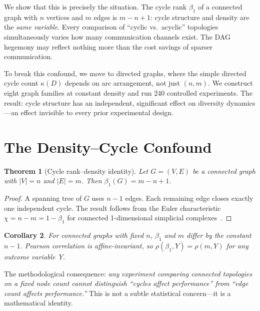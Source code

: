 \documentclass[10pt,twocolumn]{article}
\newtheorem{theorem}{Theorem}
\newtheorem{corollary}[theorem]{Corollary}
\begin{document}
We show that this is precisely the situation. The cycle rank $\beta_1$ of a
connected graph with $n$ vertices and $m$ edges is $m - n + 1$: cycle
structure and density are the \emph{same variable}. Every comparison of
``cyclic vs.\ acyclic'' topologies simultaneously varies how many
communication channels exist. The DAG hegemony may reflect nothing more than
the cost savings of sparser communication.

To break this confound, we move to directed graphs, where the simple
directed cycle count $\kappa(D)$ depends on arc arrangement, not just
$(n, m)$. We construct eight graph families at constant density and run
240 controlled experiments. The result: cycle structure has an independent,
significant effect on diversity dynamics---an effect invisible to every
prior experimental design.

\section{The Density--Cycle Confound}
\label{sec:confound}

\begin{theorem}[Cycle rank--density identity]
\label{thm:confound}
Let $G = (V, E)$ be a connected graph with $|V| = n$ and $|E| = m$. Then
$\beta_1(G) = m - n + 1$.
\end{theorem}

\begin{proof}
A spanning tree of $G$ uses $n - 1$ edges. Each remaining edge closes
exactly one independent cycle. The result follows from the Euler
characteristic $\chi = n - m = 1 - \beta_1$ for connected 1-dimensional
simplicial complexes~\citep{hatcher2002algebraic}.
\end{proof}

\begin{corollary}
\label{cor:pearson}
For connected graphs with fixed $n$, $\beta_1$ and $m$ differ by the
constant $n - 1$. Pearson correlation is affine-invariant, so
$\rho(\beta_1, Y) = \rho(m, Y)$ for any outcome variable~$Y$.
\end{corollary}

The methodological consequence: \emph{any experiment comparing connected
topologies on a fixed node count cannot distinguish ``cycles affect
performance'' from ``edge count affects performance.''} This is not a subtle
statistical concern---it is a mathematical identity.
\end{document}
